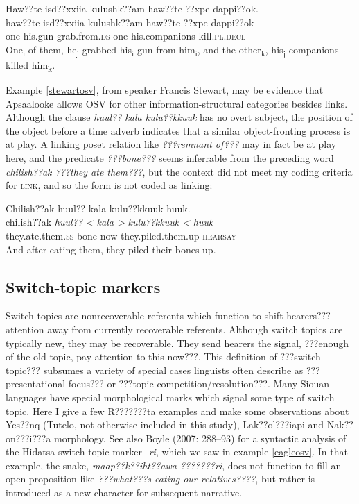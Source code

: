 \documentclass[output=paper]{LSP/langsci}
\begin{document}
\ea\label{apsaalookeosv}
	Haw??te isd??xxiia kulushk??am haw??te ??xpe dappi??ok.\\
\gll	haw??te 	isd??xxiia 	kulushk??am			haw??te 	??xpe 			dappi??ok\\
	one 		his.gun 	grab.from.\textsc{ds} 	one 		his.companions	kill.\textsc{pl.decl}\\
\glt	One\textsubscript{i} of them, he\textsubscript{j} grabbed his\textsubscript{i} gun from him\textsubscript{i}, and the other\textsubscript{k}, his\textsubscript{j} companions killed him\textsubscript{k}.
\z

Example \ref{stewartosv}, from speaker Francis Stewart, may be evidence that Apsaalooke allows OSV for other information-structural categories besides links. Although the clause \emph{huul?? kala kulu??kkuuk} has no overt subject, the position of the object before a time adverb indicates that a similar object-fronting process is at play. A linking poset relation like \emph{???remnant of???} may in fact be at play here, and the predicate \emph{???bone???} seems inferrable from the preceding word \emph{chilish??ak ???they ate them???}, but the context did not meet my coding criteria for \textsc{link}, and so the form is not coded as linking:

\ea\label{stewartosv}
Chilish??ak huul?? kala kulu??kkuuk huuk.\footnotemark\\
\gll	chilish??ak 				\emph{huul?? <}	\emph{kala >}	\emph{kulu??kkuuk <}	\emph{huuk}\\
	they.ate.them.\textsc{ss} 	bone 			now 			they.piled.them.up 		\textsc{hearsay}\\
\glt	And after eating them, they piled their bones up.
\z

\subsection{Switch-topic markers}\label{switchtopic}

	Switch topics are nonrecoverable referents which function to shift hearers??? attention away from currently recoverable referents. Although switch topics are typically new, they may be recoverable. They send hearers the signal, ???enough of the old topic, pay attention to this now???. This definition of ???switch topic??? subsumes a variety of special cases linguists often describe as ???presentational focus??? or ???topic competition/resolution???. Many Siouan languages have special morphological marks which signal some type of switch topic. Here I give a few R???????ta examples and make some observations about Yes??nq (Tutelo, not otherwise included in this study), Lak??ol???iapi and Nak??on???i???a morphology. See also Boyle (2007: 288--93) for a syntactic analysis of the Hidatsa switch-topic marker \emph{-ri}, which we saw in example \ref{eagleosv}. In that example, the snake, \emph{maap??k??iht??awa ???????ri}, does not function to fill an open proposition like \emph{???what???s eating our relatives????}, but rather is introduced as a new character for subsequent narrative.
	
\end{document}
